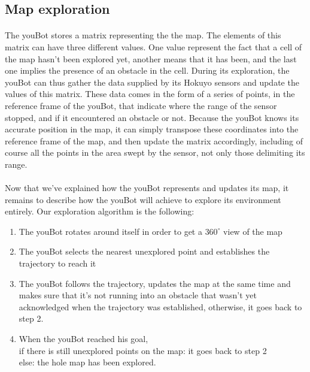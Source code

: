 \documentclass[12pt,a4paper]{article}
\begin{document}
\subsection{Map exploration}
\paragraph{}
The youBot stores a matrix representing the the map. The elements of this matrix can have three different values. One value represent the fact that a cell of the map hasn't been explored yet, another means that it has been, and the last one implies the presence of an obstacle in the cell. During its exploration, the youBot can thus gather the data supplied by its Hokuyo sensors and update the values of this matrix. These data comes in the form of a series of points, in the reference frame of the youBot, that indicate where the range of the sensor stopped, and if it encountered an obstacle or not. Because the youBot knows its accurate position in the map, it can simply transpose these coordinates into the reference frame of the map, and then update the matrix accordingly, including of course all the points in the area swept by the sensor, not only those delimiting its range.   

\paragraph{} 
Now that we've explained how the youBot represents and updates its map, it remains to describe how the youBot will achieve to explore its environment entirely. Our exploration algorithm is the following:

\begin{enumerate}
\item The youBot rotates around itself in order to get a $360^{\circ}$ view of the map

\item The youBot selects the nearest unexplored point and establishes the trajectory to reach it

\item The youBot follows the trajectory, updates the map at the same time and makes sure that it's not running into an obstacle that wasn't yet acknowledged when the trajectory was established, otherwise, it goes back to step 2.

\item When the youBot reached his goal, \\if there is still unexplored points on the map: it goes back to step 2 \\else: the hole map has been explored.

\end{enumerate}
\end{document}
